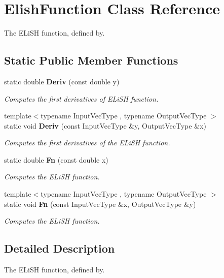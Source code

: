 \section{Elish\+Function Class Reference}
\label{classmlpack_1_1ann_1_1ElishFunction}


The E\+Li\+SH function, defined by.  


\subsection*{Static Public Member Functions}
\begin{DoxyCompactItemize}
\item 
static double \textbf{ Deriv} (const double y)
\begin{DoxyCompactList}\small\item\em Computes the first derivatives of E\+Li\+SH function. \end{DoxyCompactList}\item 
{\footnotesize template$<$typename Input\+Vec\+Type , typename Output\+Vec\+Type $>$ }\\static void \textbf{ Deriv} (const Input\+Vec\+Type \&y, Output\+Vec\+Type \&x)
\begin{DoxyCompactList}\small\item\em Computes the first derivatives of the E\+Li\+SH function. \end{DoxyCompactList}\item 
static double \textbf{ Fn} (const double x)
\begin{DoxyCompactList}\small\item\em Computes the E\+Li\+SH function. \end{DoxyCompactList}\item 
{\footnotesize template$<$typename Input\+Vec\+Type , typename Output\+Vec\+Type $>$ }\\static void \textbf{ Fn} (const Input\+Vec\+Type \&x, Output\+Vec\+Type \&y)
\begin{DoxyCompactList}\small\item\em Computes the E\+Li\+SH function. \end{DoxyCompactList}\end{DoxyCompactItemize}


\subsection{Detailed Description}
The E\+Li\+SH function, defined by. 

